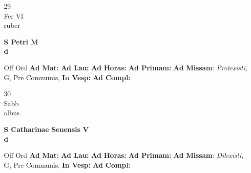 \documentclass[10pt, openany]{book}
\begin{document}
    \begin{center}
        \begin{minipage}{3.5in}
            \vspace{2em}
            \begin{minipage}{0.5in}
                {\Huge 29} \\
                {\normalsize Fer VI} \\
                {\normalsize ruber}
            \end{minipage}
            \begin{minipage}{3.0in}
                \textbf{ \large S Petri M \\
                \textnormal{\normalsize d}} \\ 
            \end{minipage}
            \begin{justify}Off Ord
                \textbf{Ad Mat: }
                \textbf{Ad Lau: }
                \textbf{Ad Horas: }
                \textbf{Ad Primam: }\textbf{Ad Missam}: \textit{Protexisti,} G, Pre Communis,  
                \textbf{In Vesp: }
                \textbf{Ad Compl: }
            \end{justify}
        \end{minipage}
    \end{center}

    \begin{center}
        \begin{minipage}{3.5in}
            \vspace{2em}
            \begin{minipage}{0.5in}
                {\Huge 30} \\
                {\normalsize Sabb} \\
                {\normalsize albus}
            \end{minipage}
            \begin{minipage}{3.0in}
                \textbf{ \large S Catharinae Senensis V \\
                \textnormal{\normalsize d}} \\ 
            \end{minipage}
            \begin{justify}Off Ord
                \textbf{Ad Mat: }
                \textbf{Ad Lau: }
                \textbf{Ad Horas: }
                \textbf{Ad Primam: }\textbf{Ad Missam}: \textit{Dilexisti,} G, Pre Communis,  
                \textbf{In Vesp: }
                \textbf{Ad Compl: }
            \end{justify}
        \end{minipage}
    \end{center}
\end{document}

